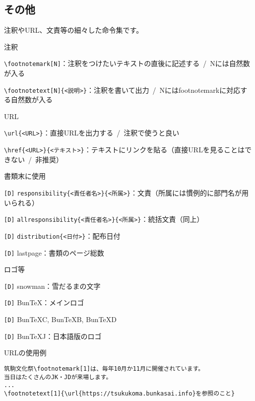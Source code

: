 \begin{multicols*}{2}
\section{その他}
注釈やURL、文責等の細々した命令集です。
\begin{framebox-simple}{注釈}
    \begin{reitemize}
        \item \verb|\footnotemark[N]|：注釈をつけたいテキストの直後に記述する~/~Nには自然数が入る
        \item \verb|\footnotetext[N]{<説明>}|：注釈を書いて出力~/~Nにはfootnotemarkに対応する自然数が入る
    \end{reitemize}
\end{framebox-simple}
\begin{framebox-simple}{URL}
    \begin{reitemize}
        \item \verb|\url{<URL>}|：直接URLを出力する~/~注釈で使うと良い
        \item \verb|\href{<URL>}{<テキスト>}|：テキストにリンクを貼る（直接URLを見ることはできない~/~非推奨）
    \end{reitemize}
\end{framebox-simple}
\begin{framebox-simple}{書類末に使用}
    \begin{reitemize}
        \item \verb|[D]| \verb|responsibility{<責任者名>}{<所属>}|：文責（所属には慣例的に部門名が用いられる）
        \item \verb|[D]| \verb|allresponsibility{<責任者名>}{<所属>}|：統括文責（同上）
        \item \verb|[D]| \verb|distribution{<日付>}|：配布日付
        \item \verb|[D]| lastpage：書類のページ総数
    \end{reitemize}
\end{framebox-simple}
\begin{framebox-simple}{ロゴ等}
    \begin{reitemize}
        \item \verb|[D]| snowman：雪だるまの文字
        \item \verb|[D]| BunTeX：メインロゴ
        \item \verb|[D]| BunTeXC, BunTeXB, BunTeXD
        \item \verb|[D]| BunTeXJ：日本語版のロゴ
    \end{reitemize}
\end{framebox-simple}
\begin{framebox-ref}{URLの使用例}
\begin{verbatim}
筑駒文化祭\footnotemark[1]は、毎年10月か11月に開催されています。
当日はたくさんのJK・JDが来場します。
...
\footnotetext[1]{\url{https://tsukukoma.bunkasai.info}を参照のこと}
\end{verbatim}
\end{framebox-ref}


\end{multicols*}
